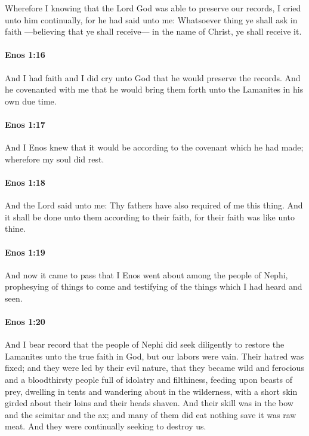 			Wherefore I knowing
			that the Lord God was able to preserve our records,
			I cried unto him continually,
			for he had said unto me:
			Whatsoever thing ye shall ask in faith
			---believing that ye shall receive---
			in the name of Christ,
			ye shall receive it.

		\paragraph{Enos 1:16} %
			\label{ENOS-1-16}

			And I had faith and I did cry unto God
			that he would preserve the records.
			And he covenanted with me
			that he would bring them forth unto the Lamanites in his own due time.

		\paragraph{Enos 1:17} %
			\label{ENOS-1-17}

			And I Enos knew that it would be according to the covenant which he had made;
			wherefore my soul did rest.

		\paragraph{Enos 1:18} %
			\label{ENOS-1-18}

			And the Lord said unto me:
			Thy fathers have also required of me this thing.
			And it shall be done unto them according to their faith,
			for their faith was like unto thine.

		\paragraph{Enos 1:19} %
			\label{ENOS-1-19}

			And now it came to pass that
			I Enos went about among the people of Nephi,
			prophesying of things to come
			and testifying of the things which I had heard and seen.

		\paragraph{Enos 1:20} %
			\label{ENOS-1-20}

			And I bear record that the people of Nephi did seek diligently
			to restore the Lamanites unto the true faith in God,
			but our labors were vain.
			Their hatred was fixed;
			and they were led by their evil nature,
			that they became wild and ferocious
			and a bloodthirsty people full of idolatry and filthiness,
			feeding upon beasts of prey,
			dwelling in tents and wandering about in the wilderness,
			with a short skin girded about their loins and their heads shaven.
			And their skill was in the bow and the scimitar and the ax;
			and many of them did eat nothing save it was raw meat.
			And they were continually seeking to destroy us.

